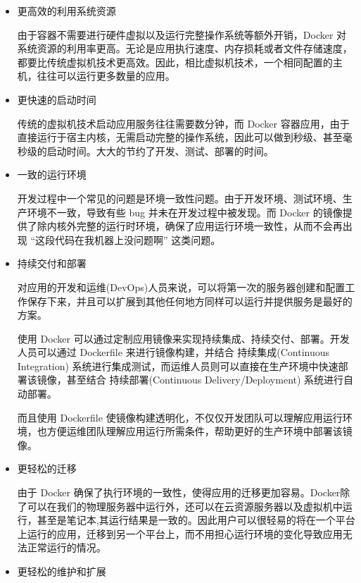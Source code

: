 \begin{itemize}
\item 更高效的利用系统资源

由于容器不需要进行硬件虚拟以及运行完整操作系统等额外开销，Docker 对系统资源的利用率更高。无论是应用执行速度、内存损耗或者文件存储速度，都要比传统虚拟机技术更高效。因此，相比虚拟机技术，一个相同配置的主机，往往可以运行更多数量的应用。
\item 更快速的启动时间

传统的虚拟机技术启动应用服务往往需要数分钟，而 Docker 容器应用，由于直接运行于宿主内核，无需启动完整的操作系统，因此可以做到秒级、甚至毫秒级的启动时间。大大的节约了开发、测试、部署的时间。
\item 一致的运行环境

开发过程中一个常见的问题是环境一致性问题。由于开发环境、测试环境、生产环境不一致，导致有些 bug 并未在开发过程中被发现。而 Docker 的镜像提供了除内核外完整的运行时环境，确保了应用运行环境一致性，从而不会再出现 “这段代码在我机器上没问题啊” 这类问题。
\item 持续交付和部署

对应用的开发和运维(DevOps)人员来说，可以将第一次的服务器创建和配置工作保存下来，并且可以扩展到其他任何地方同样可以运行并提供服务是最好的方案。

使用 Docker 可以通过定制应用镜像来实现持续集成、持续交付、部署。开发人员可以通过 Dockerfile 来进行镜像构建，并结合 持续集成(Continuous Integration) 系统进行集成测试，而运维人员则可以直接在生产环境中快速部署该镜像，甚至结合 持续部署(Continuous Delivery/Deployment) 系统进行自动部署。

而且使用 Dockerfile 使镜像构建透明化，不仅仅开发团队可以理解应用运行环境，也方便运维团队理解应用运行所需条件，帮助更好的生产环境中部署该镜像。
\item 更轻松的迁移

由于 Docker 确保了执行环境的一致性，使得应用的迁移更加容易。Docker除了可以在我们的物理服务器中运行外，还可以在云资源服务器以及虚拟机中运行，甚至是笔记本,其运行结果是一致的。因此用户可以很轻易的将在一个平台上运行的应用，迁移到另一个平台上，而不用担心运行环境的变化导致应用无法正常运行的情况。
\item 更轻松的维护和扩展


\end{itemize}
